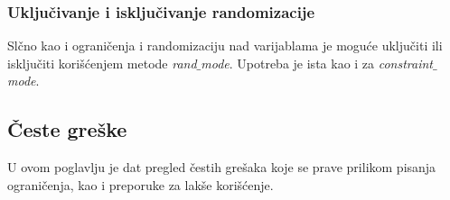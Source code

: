 

\subsubsection{Uključivanje i isključivanje randomizacije}

Slčno kao i ograničenja i randomizaciju nad varijablama je moguće uključiti ili
isključiti korišćenjem metode \emph{rand\(\_\)mode}. Upotreba je ista kao i za
\emph{constraint\(\_\)mode}.


\subsection{Česte greške}

U ovom poglavlju je dat pregled čestih grešaka koje se prave prilikom pisanja
ograničenja, kao i preporuke za lakše korišćenje.

